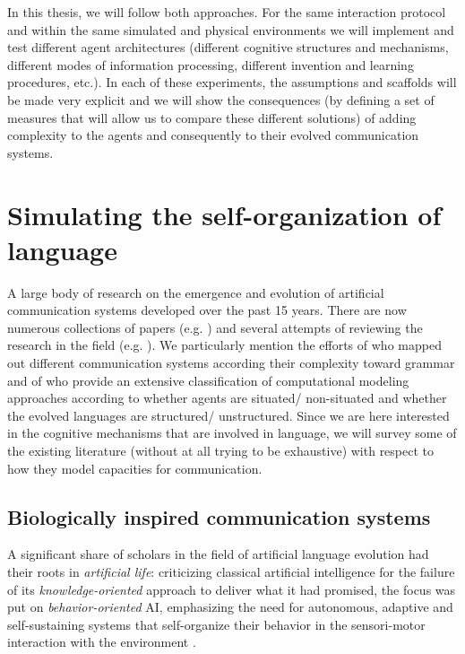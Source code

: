 In this thesis, we will follow both approaches. For the same
interaction protocol and within the same simulated and physical
environments we will implement and test different agent architectures
(different cognitive structures and mechanisms, different modes of
information processing, different invention and learning procedures,
etc.). In each of these experiments, the assumptions and scaffolds
will be made very explicit and we will show the consequences (by
defining a set of measures that will allow us to compare these
different solutions) of adding complexity to the agents and
consequently to their evolved communication systems.


\section{Simulating the self-organization of language}

A large body of research on the emergence and evolution of artificial
communication systems developed over the past 15 years. There are now
numerous collections of papers
(e.g. \citealp{cangelosi02simulating,hurford97approaches,briscoe02linguistic,proceedings-evolang06,proceedings-evolang08,steels12experiments})
and several attempts of reviewing the research in the field (e.g.
\citealp{kirby02natural,christiansen03language,steels97synthetic,steels98synthesising,steels00language,steels01language,steels03evolution,steels06semiotic,steels03evolving}). We
particularly mention the efforts of \cite{steels05emergence} who
mapped out different communication systems according their complexity
toward grammar and of \cite{wagner03progress} who provide an extensive
classification of computational modeling approaches according to
whether agents are situated/ non-situated and whether the evolved
languages are structured/ unstructured. Since we are here interested
in the cognitive mechanisms that are involved in language, we will
survey some of the existing literature (without at all trying to be
exhaustive) with respect to how they model capacities for
communication.



\subsection{Biologically inspired communication systems}

A significant share of scholars in the field of artificial language
evolution had their roots in \emph{artificial life}: criticizing
classical artificial intelligence for the failure of its
\emph{knowledge-oriented} approach to deliver what it had promised,
the focus was put on \emph{behavior-oriented} AI, emphasizing the need
for autonomous, adaptive and self-sustaining systems that
self-organize their behavior in the sensori-motor interaction with the
environment
\citep{steels94alife-route,steels94alife-roots,brooks91representation,brooks90elephants,pfeifer99understanding}.

